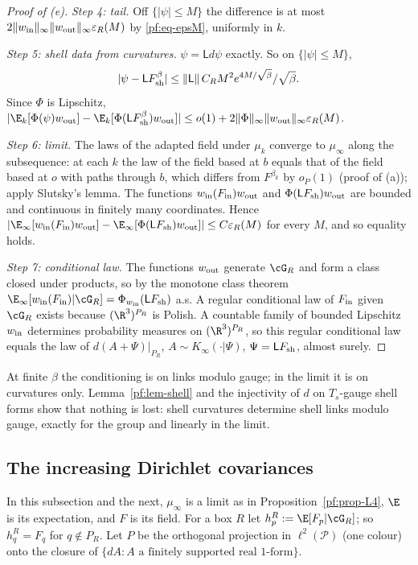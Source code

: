 \begin{proof}[Proof of (e)]
\emph{Step 4: tail.} Off $\{|\psi|\le M\}$ the difference is at most $2\|w_{\rm in}\|_\infty\|w_{\rm out}\|_\infty\varepsilon_R(M)$ by \eqref{pf:eq-epsM}, uniformly in $k$.

\emph{Step 5: shell data from curvatures.} $\psi=\mathsf Ld\psi$ exactly. So on $\{|\psi|\le M\}$,
\[|\psi-\mathsf LF^{\beta}_{\rm sh}|\le\|\mathsf L\|\,C_RM^2e^{4M/\sqrt\beta}/\sqrt\beta .\] Since $\Phi$ is Lipschitz, $|\E_k[\Phi(\psi)w_{\rm out}]-\E_k[\Phi(\mathsf LF^\beta_{\rm sh})w_{\rm out}]|\le o(1)+2\|\Phi\|_\infty\|w_{\rm out}\|_\infty\varepsilon_R(M)$.

\emph{Step 6: limit.} The laws of the adapted field under $\mu_k$ converge to $\mu_\infty$ along the subsequence: at each $k$ the law of the field based at $b$ equals that of the field based at $o$ with paths through $b$, which differs from $F^{\beta_k}$ by $o_P(1)$ (proof of (a)); apply Slutsky's lemma. The functions $w_{\rm in}(F_{\rm in})w_{\rm out}$ and $\Phi(\mathsf LF_{\rm sh})w_{\rm out}$ are bounded and continuous in finitely many coordinates. Hence
$|\E_\infty[w_{\rm in}(F_{\rm in})w_{\rm out}]-\E_\infty[\Phi(\mathsf LF_{\rm sh})w_{\rm out}]|\le C\varepsilon_R(M)$ for every $M$, and so equality holds.

\emph{Step 7: conditional law.} The functions $w_{\rm out}$ generate $\cG_R$ and form a class closed under products, so by the monotone class theorem $\E_\infty[w_{\rm in}(F_{\rm in})|\cG_R]=\Phi_{w_{\rm in}}(\mathsf LF_{\rm sh})$ a.s. A regular conditional law of $F_{\rm in}$ given $\cG_R$ exists because $(\R^3)^{P_R}$ is Polish. A countable family of bounded Lipschitz $w_{\rm in}$ determines probability measures on $(\R^3)^{P_R}$, so this regular conditional law equals the law of $d(A+\Psi)|_{P_R}$, $A\sim K_\infty(\cdot|\Psi)$, $\Psi=\mathsf LF_{\rm sh}$, almost surely.
\end{proof}

At finite $\beta$ the conditioning is on links modulo gauge; in the limit it is on curvatures only. Lemma~\ref{pf:lem-shell} and the injectivity of $d$ on $T_s$-gauge shell forms show that nothing is lost: shell curvatures determine shell links modulo gauge, exactly for the group and linearly in the limit.

\subsection{The increasing Dirichlet covariances}\label{pf:sec-D}

In this subsection and the next, $\mu_\infty$ is a limit as in Proposition~\ref{pf:prop-L4}, $\E$ is its expectation, and $F$ is its field. For a box $R$ let $h^R_p:=\E[F_p|\cG_R]$; so $h^R_q=F_q$ for $q\notin P_R$.
Let $P$ be the orthogonal projection in $\ell^2(\mathcal P)$ (one colour) onto the closure of $\{dA:A\text{ a finitely supported real }1\text{-form}\}$.

